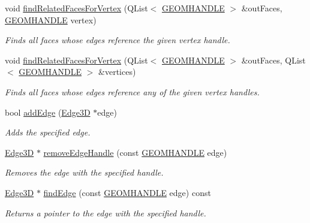 \begin{DoxyCompactItemize}
void \hyperlink{class_solid3_d_a00bfad9d7e6dbe5ff290074753329e92}{find\-Related\-Faces\-For\-Vertex} (Q\-List$<$ \hyperlink{vertex_8h_a72202e57358ed73cd212e9a2eaf39aeb}{G\-E\-O\-M\-H\-A\-N\-D\-L\-E} $>$ \&out\-Faces, \hyperlink{vertex_8h_a72202e57358ed73cd212e9a2eaf39aeb}{G\-E\-O\-M\-H\-A\-N\-D\-L\-E} vertex)
\begin{DoxyCompactList}\small\item\em Finds all faces whose edges reference the given vertex handle. \end{DoxyCompactList}\item 
void \hyperlink{class_solid3_d_ac2b735d2b9ee6e47f56b49e4b122582c}{find\-Related\-Faces\-For\-Vertex} (Q\-List$<$ \hyperlink{vertex_8h_a72202e57358ed73cd212e9a2eaf39aeb}{G\-E\-O\-M\-H\-A\-N\-D\-L\-E} $>$ \&out\-Faces, Q\-List$<$ \hyperlink{vertex_8h_a72202e57358ed73cd212e9a2eaf39aeb}{G\-E\-O\-M\-H\-A\-N\-D\-L\-E} $>$ \&vertices)
\begin{DoxyCompactList}\small\item\em Finds all faces whose edges reference any of the given vertex handles. \end{DoxyCompactList}\item 
bool \hyperlink{class_solid3_d_aad6d7269dbea23a025ba3f598183bc22}{add\-Edge} (\hyperlink{class_edge3_d}{Edge3\-D} $\ast$edge)
\begin{DoxyCompactList}\small\item\em Adds the specified edge. \end{DoxyCompactList}\item 
\hyperlink{class_edge3_d}{Edge3\-D} $\ast$ \hyperlink{class_solid3_d_a3874333554e5105e789e06de3accb9d5}{remove\-Edge\-Handle} (const \hyperlink{vertex_8h_a72202e57358ed73cd212e9a2eaf39aeb}{G\-E\-O\-M\-H\-A\-N\-D\-L\-E} edge)
\begin{DoxyCompactList}\small\item\em Removes the edge with the specified handle. \end{DoxyCompactList}\item 
\hyperlink{class_edge3_d}{Edge3\-D} $\ast$ \hyperlink{class_solid3_d_ab5a26fa3df1a830f972bd3a57d412a08}{find\-Edge} (const \hyperlink{vertex_8h_a72202e57358ed73cd212e9a2eaf39aeb}{G\-E\-O\-M\-H\-A\-N\-D\-L\-E} edge) const 
\begin{DoxyCompactList}\small\item\em Returns a pointer to the edge with the specified handle. \end{DoxyCompactList}\item 

\end{DoxyCompactItemize}
